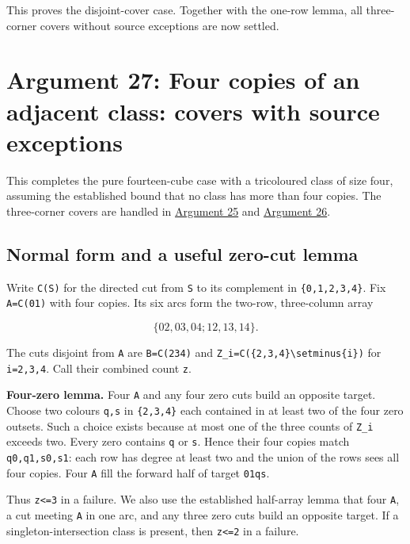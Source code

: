 \documentclass[
  10pt,
]{article}
\begin{document}
This proves the disjoint-cover case. Together with the one-row lemma,
all three-corner covers without source exceptions are now settled.

\hypertarget{arg-27}{%
\section{Argument 27: Four copies of an adjacent class: covers with
source exceptions}\label{arg-27}}

This completes the pure fourteen-cube case with a tricoloured class of
size four, assuming the established bound that no class has more than
four copies. The three-corner covers are handled in
\protect\hyperlink{arg-25}{Argument 25} and
\protect\hyperlink{arg-26}{Argument 26}.

\hypertarget{normal-form-and-a-useful-zero-cut-lemma}{%
\subsection*{Normal form and a useful zero-cut
lemma}\label{normal-form-and-a-useful-zero-cut-lemma}}

Write \texttt{C(S)} for the directed cut from \texttt{S} to its
complement in \texttt{\{0,1,2,3,4\}}. Fix \texttt{A=C(01)} with four
copies. Its six arcs form the two-row, three-column array

\[
\{02,03,04;12,13,14\}.
\]

The cuts disjoint from \texttt{A} are \texttt{B=C(234)} and
\texttt{Z\_i=C(\{2,3,4\}\textbackslash{}setminus\{i\})} for
\texttt{i=2,3,4}. Call their combined count \texttt{z}.

\textbf{Four-zero lemma.} Four \texttt{A} and any four zero cuts build
an opposite target. Choose two colours \texttt{q,s} in
\texttt{\{2,3,4\}} each contained in at least two of the four zero
outsets. Such a choice exists because at most one of the three counts of
\texttt{Z\_i} exceeds two. Every zero contains \texttt{q} or \texttt{s}.
Hence their four copies match \texttt{q0,q1,s0,s1}: each row has degree
at least two and the union of the rows sees all four copies. Four
\texttt{A} fill the forward half of target \texttt{01\textbar{}qs}.

Thus \texttt{z\textless{}=3} in a failure. We also use the established
half-array lemma that four \texttt{A}, a cut meeting \texttt{A} in one
arc, and any three zero cuts build an opposite target. If a
singleton-intersection class is present, then \texttt{z\textless{}=2} in
a failure.
\end{document}
